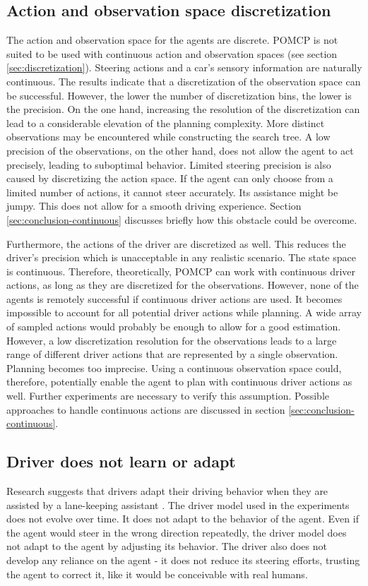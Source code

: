 \subsection{Action and observation space discretization}

The action and observation space for the agents are discrete. POMCP is not suited to be used with continuous action and observation spaces (see section \ref{sec:discretization}). Steering actions and a car's sensory information are naturally continuous. The results indicate that a discretization of the observation space can be successful. However, the lower the number of discretization bins, the lower is the precision. On the one hand, increasing the resolution of the discretization can lead to a considerable elevation of the planning complexity. More distinct observations may be encountered while constructing the search tree. A low precision of the observations, on the other hand, does not allow the agent to act precisely, leading to suboptimal behavior. Limited steering precision is also caused by discretizing the action space. If the agent can only choose from a limited number of actions, it cannot steer accurately. Its assistance might be jumpy. This does not allow for a smooth driving experience. Section \ref{sec:conclusion-continuous} discusses briefly how this obstacle could be overcome. 

Furthermore, the actions of the driver are discretized as well. This reduces the driver's precision which is unacceptable in any realistic scenario. The state space is continuous. Therefore, theoretically, POMCP can work with continuous driver actions, as long as they are discretized for the observations. However, none of the agents is remotely successful if continuous driver actions are used. It becomes impossible to account for all potential driver actions while planning. A wide array of sampled actions would probably be enough to allow for a good estimation. However, a low discretization resolution for the observations leads to a large range of different driver actions that are represented by a single observation. Planning becomes too imprecise. Using a continuous observation space could, therefore, potentially enable the agent to plan with continuous driver actions as well. Further experiments are necessary to verify this assumption. Possible approaches to handle continuous actions are discussed in section \ref{sec:conclusion-continuous}.

\subsection{Driver does not learn or adapt}

Research suggests that drivers adapt their driving behavior when they are assisted by a lane-keeping assistant \parencite{behavior_adapt}. The driver model used in the experiments does not evolve over time. It does not adapt to the behavior of the agent. Even if the agent would steer in the wrong direction repeatedly, the driver model does not adapt to the agent by adjusting its behavior. The driver also does not develop any reliance on the agent - it does not reduce its steering efforts, trusting the agent to correct it, like it would be conceivable with real humans.